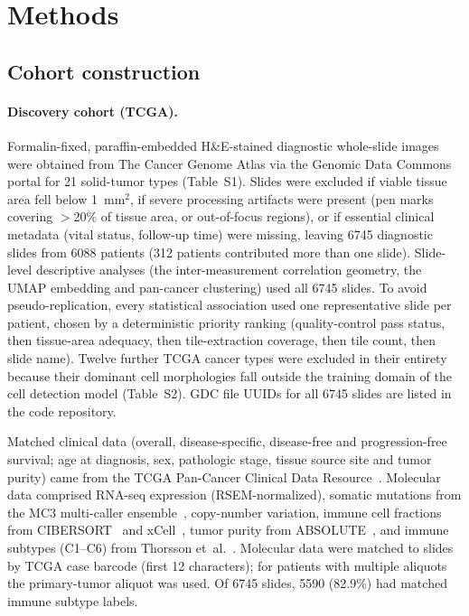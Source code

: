 \section{Methods}
\label{sec:methods}

\subsection{Cohort construction}
\label{sec:methods:cohorts}

\paragraph{Discovery cohort (TCGA).}
Formalin-fixed, paraffin-embedded H\&E-stained diagnostic whole-slide images were
obtained from The Cancer Genome Atlas via the Genomic Data Commons portal for 21
solid-tumor types (Table~S1). Slides were excluded if viable tissue
area fell below 1~mm$^2$, if severe processing artifacts were present (pen marks
covering $>$20\% of tissue area, or out-of-focus regions), or if essential
clinical metadata (vital status, follow-up time) were missing, leaving
\num{6745} diagnostic slides from \num{6088} patients (312 patients contributed
more than one slide). Slide-level descriptive analyses (the inter-measurement
correlation geometry, the UMAP embedding and pan-cancer clustering) used all
\num{6745} slides. To avoid pseudo-replication, every statistical association
used one representative slide per patient, chosen by a deterministic priority
ranking (quality-control pass status, then tissue-area adequacy, then
tile-extraction coverage, then tile count, then slide name). Twelve further
TCGA cancer types were excluded in their entirety because their dominant cell
morphologies fall outside the training domain of the cell detection model
(Table~S2). GDC file UUIDs for all \num{6745} slides are listed in
the code repository.

Matched clinical data (overall, disease-specific, disease-free and
progression-free survival; age at diagnosis, sex, pathologic stage, tissue source
site and tumor purity) came from the TCGA Pan-Cancer Clinical Data
Resource~\cite{liu2018tcgacdr}. Molecular data comprised RNA-seq expression
(RSEM-normalized), somatic mutations from the MC3 multi-caller
ensemble~\cite{ellrott2018mc3}, copy-number variation, immune cell fractions from
CIBERSORT~\cite{newman2015cibersort} and xCell~\cite{aran2017xcell}, tumor purity
from ABSOLUTE~\cite{carter2012absolute}, and immune subtypes (C1--C6) from
Thorsson et~al.~\cite{thorsson2018immune}. Molecular data were matched to slides
by TCGA case barcode (first 12 characters); for patients with multiple aliquots
the primary-tumor aliquot was used. Of \num{6745} slides, \num{5590} (82.9\%) had
matched immune subtype labels.

